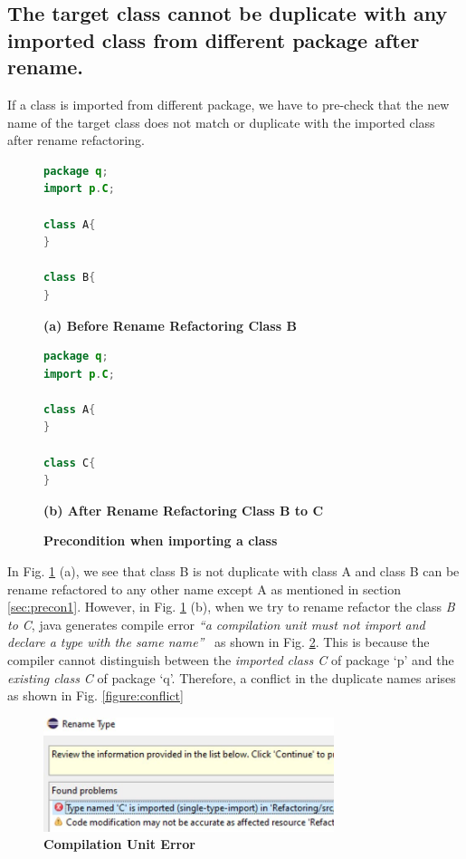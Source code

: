 \subsection{The target class cannot be duplicate with any imported class from different package after rename.}

If a class is imported from different package, we have to pre-check that the new name of the target class does not match or duplicate with the imported class after rename refactoring. 

\begin{figure}[th]
\centering
\begin{minipage}[t]{0.4\linewidth}
\begin{lstlisting}[language=java, basicstyle=\scriptsize\ttfamily,frame=single]
package q;
import p.C;

class A{
}

class B{
} 
\end{lstlisting}
\tiny{\textbf{(a) Before Rename Refactoring Class B}}
\end{minipage}
\hfill
\begin{minipage}[t]{0.4\linewidth}
\begin{lstlisting}[language=java, basicstyle=\scriptsize\ttfamily,frame=single]
package q;
import p.C;

class A{
}

class C{
} 
\end{lstlisting}
\tiny{\textbf{(b) After Rename Refactoring Class B to C}}
\end{minipage}
\caption{\textbf{Precondition when importing a class}}
\label{figure:fig2}
\end{figure}

In Fig. \ref{figure:fig2} (a), we see that class B is not duplicate with class A and class B can be rename refactored to any other name except A as mentioned in section \ref{sec:precon1}. However, in Fig. \ref{figure:fig2} (b), when we try to rename refactor the class \emph{B to C}, java generates compile error \textit{``a compilation unit must not import and declare a type with the same name''}~\cite{EclipseWebPage} as shown in Fig. \ref{figure:comperr}.
This is because the compiler cannot distinguish between the \emph{imported class C} of package `p' and the \emph{existing class C} of package `q'. Therefore, a conflict in the duplicate names arises as shown in Fig. \ref{figure:conflict}

\begin{figure}[H]
\centerline{\includegraphics[width=85mm,scale=0.5]{CUE.jpg}}
\caption{\textbf{Compilation Unit Error} }
\label{figure:comperr}
\end{figure}

